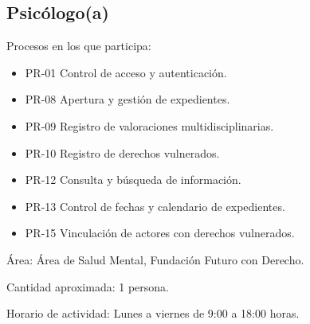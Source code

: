 \begin{Usuario}{\hypertarget{A.Psicologo}{\subsection{Psicólogo(a)}}}
	\item[Procesos en los que participa:] \cdtEmpty
	\begin{itemize}
		\item PR-01 Control de acceso y autenticación.
		\item PR-08 Apertura y gestión de expedientes.
		\item PR-09 Registro de valoraciones multidisciplinarias.
		\item PR-10 Registro de derechos vulnerados.
		\item PR-12 Consulta y búsqueda de información.
		\item PR-13 Control de fechas y calendario de expedientes.
		\item PR-15 Vinculación de actores con derechos vulnerados.
	\end{itemize}
	
	\item[Área:] Área de Salud Mental, Fundación Futuro con Derecho.
	\item[Cantidad aproximada:] 1 persona.
	\item[Horario de actividad:] Lunes a viernes de 9:00 a 18:00 horas.
\end{Usuario}

